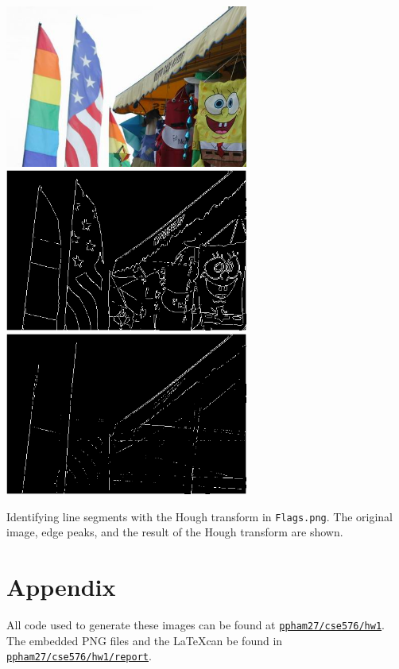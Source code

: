 \documentclass[letterpaper]{article}
\begin{document}
\begin{center}
  \includegraphics[width=0.6\textwidth]{houghtask1.png}
  \includegraphics[width=0.6\textwidth]{houghtask2.png}
  \includegraphics[width=0.6\textwidth]{houghtask3.png}

  Identifying line segments with the Hough transform in \texttt{Flags.png}. The
  original image, edge peaks, and the result of the Hough transform are shown.
\end{center}

\section*{Appendix}

All code used to generate these images can be found at
\href{https://github.com/ppham27/cse576/blob/master/hw1}{\texttt{ppham27/cse576/hw1}}. The
embedded PNG files and the \LaTeX can be found in
\href{https://github.com/ppham27/cse576/blob/master/hw1/report}{\texttt{ppham27/cse576/hw1/report}}.
\end{document}

